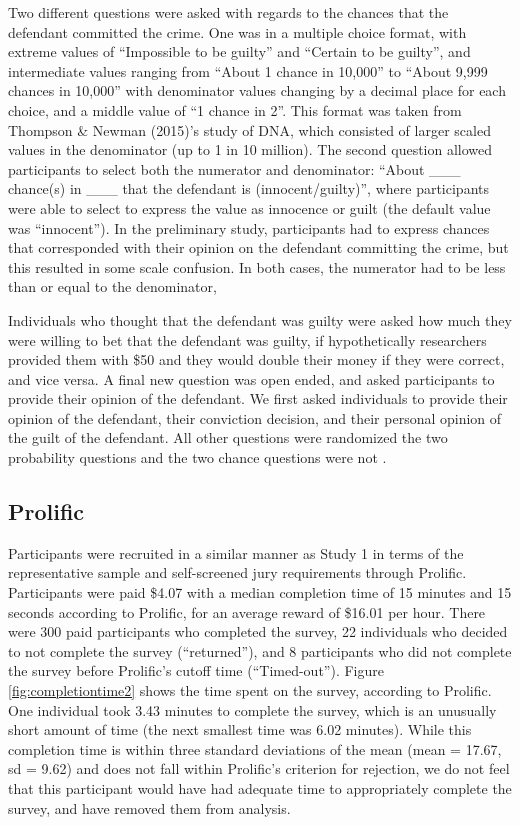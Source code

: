 \documentclass[print]{nuthesis}
\begin{document}
Two different questions were asked with regards to the chances that the defendant committed the crime.
One was in a multiple choice format, with extreme values of ``Impossible to be guilty'' and ``Certain to be guilty'', and intermediate values ranging from ``About 1 chance in 10,000'' to ``About 9,999 chances in 10,000'' with denominator values changing by a decimal place for each choice, and a middle value of ``1 chance in 2''.
This format was taken from Thompson \& Newman (2015)'s study of DNA, which consisted of larger scaled values in the denominator (up to 1 in 10 million).
The second question allowed participants to select both the numerator and denominator: ``About \_\_\_ chance(s) in \_\_\_ that the defendant is (innocent/guilty)'', where participants were able to select to express the value as innocence or guilt (the default value was ``innocent'').
In the preliminary study, participants had to express chances that corresponded with their opinion on the defendant committing the crime, but this resulted in some scale confusion.
In both cases, the numerator had to be less than or equal to the denominator, 

Individuals who thought that the defendant was guilty were asked how much they were willing to bet that the defendant was guilty, if hypothetically researchers provided them with \$50 and they would double their money if they were correct, and vice versa.
A final new question was open ended, and asked participants to provide their opinion of the defendant.
We first asked individuals to provide their opinion of the defendant, their conviction decision, and their personal opinion of the guilt of the defendant.
All other questions were randomized  the two probability questions and the two chance questions were not .

\hypertarget{prolific-1}{%
\subsection{Prolific}\label{prolific-1}}

Participants were recruited in a similar manner as Study 1 in terms of the representative sample and self-screened jury requirements through Prolific.
Participants were paid \$4.07 with a median completion time of 15 minutes and 15 seconds according to Prolific, for an average reward of \$16.01 per hour.
There were 300 paid participants who completed the survey, 22 individuals who decided to not complete the survey (``returned''), and 8 participants who did not complete the survey before Prolific's cutoff time (``Timed-out'').
Figure \ref{fig:completiontime2} shows the time spent on the survey, according to Prolific.
One individual took 3.43 minutes to complete the survey, which is an unusually short amount of time (the next smallest time was 6.02 minutes).
While this completion time is within three standard deviations of the mean (mean = 17.67, sd = 9.62) and does not fall within Prolific's criterion for rejection, we do not feel that this participant would have had adequate time to appropriately complete the survey, and have removed them from analysis.
\end{document}
